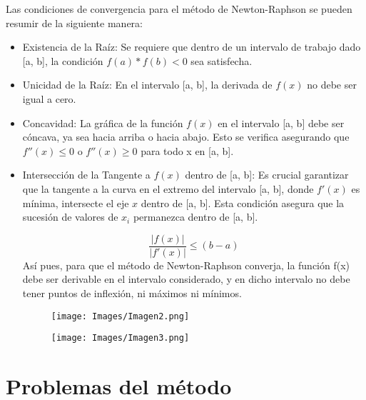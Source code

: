\documentclass[conference]{IEEEtran}
\begin{document}
Las condiciones de convergencia para el método de Newton-Raphson se pueden resumir de la siguiente manera:

\begin{itemize}
	\item Existencia de la Raíz: Se requiere que dentro de un intervalo
	      de trabajo dado [a, b], la condición $f(a) * f(b) < 0$ sea satisfecha.

	\item Unicidad de la Raíz:
	      En el intervalo [a, b], la derivada de $f(x)$ no debe ser igual a cero.

	\item Concavidad: La gráfica de la función $f(x)$ en el intervalo [a, b]
	      debe ser cóncava, ya sea hacia arriba o hacia abajo. Esto se verifica
	      asegurando que $f''(x) \leqslant 0$ o $f''(x) \geqslant 0$ para todo x en [a, b].

	\item Intersección de la Tangente a $f(x)$ dentro de [a, b]:
	      Es crucial garantizar que la tangente a la curva en el extremo del
	      intervalo [a, b], donde $f'(x)$ es mínima, intersecte el eje $x$
	      dentro de [a, b]. Esta condición asegura que la sucesión de
	      valores de $x_i$ permanezca dentro de [a, b].

	      \begin{equation*}
		      \frac{\left\lvert f(x) \right\rvert }{\left\lvert f'(x) \right\rvert} \leqslant (b - a)
	      \end{equation*}
       Así pues, para que el método de Newton-Raphson converja, la función f(x) debe ser derivable en el intervalo considerado, y en dicho intervalo no debe tener puntos de inflexión, ni máximos ni mínimos. 

       \begin{figure} [h]
            \centering
            \texttt{[image: Images/Imagen2.png]}
            \caption{}
            \label{fig:fig2}
       \end{figure}

       \begin{figure} [h]
            \centering
            \texttt{[image: Images/Imagen3.png]}
            \caption{}
            \label{fig:fig3}
       \end{figure}  

       
\end{itemize}

\section{Problemas del método}
\end{document}
